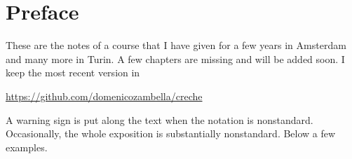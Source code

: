 \documentclass[creche.tex]{subfiles}
\begin{document}
\chapter*{Preface}

\label{praface}

% 
% 
%

These are the notes of a course that I have given for a few years in Amsterdam and many more in Turin. A few chapters are missing and will be added soon. I keep the most recent version in

\smallskip
\href{github.com/domenicozambella/creche}{https://github.com/domenicozambella/creche}
\smallskip

\noindent\llap{\textcolor{red}{\Large\danger}\kern1.5ex}A warning sign is put along the text when the notation is nonstandard. Occasionally, the whole exposition is substantially nonstandard.
Below a few examples.
\end{document}
